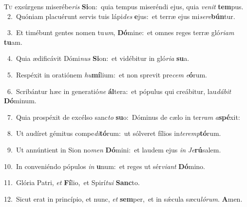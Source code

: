 \lettrine{\initial\textcolor{\initialcolor}{T}}{u} exsúrgens miserébe\textit{ris} \textbf{Si}\-on:~\star quia tempus miseréndi ejus, quia \textit{ve}\-\textit{nit} \textbf{tem}\-pus.\\
{\numbfont\textcolor{\numbcolor}{~2.}}~Quóniam placuérunt servis tuis lápi\textit{des} \textbf{e}\-jus:~\star et terræ ejus mi\-\textit{se}\-\textit{re}\textbf{bún}tur.\par
{\numbfont\textcolor{\numbcolor}{~3.}}~Et timébunt gentes nomen tu\-\textit{um}\-, \textbf{Dó}\-mine:~\star et omnes reges terræ gló\-\textit{ri}\-\textit{am} \textbf{tu}\-am.\par
{\numbfont\textcolor{\numbcolor}{~4.}}~Quia ædificávit Dómi\textit{nus} \textbf{Si}\-on:~\star et vidébitur in gló\-\textit{ri}\-\textit{a} \textbf{su}\-a.\par
{\numbfont\textcolor{\numbcolor}{~5.}}~Respéxit in oratiónem \textit{hu}\-\textbf{mí}lium:~\star et non sprevit pre\textit{cem} \textit{e}\-\textbf{ó}rum.\par
{\numbfont\textcolor{\numbcolor}{~6.}}~Scribántur hæc in generatió\textit{ne} \textbf{ál}\-tera:~\star et pópulus qui creábitur, lau\-\textit{dá}\-\textit{bit} \textbf{Dó}\-minum.\par
{\numbfont\textcolor{\numbcolor}{~7.}}~Quia prospéxit de excélso sanc\textit{to} \textbf{su}\-o:~\star Dóminus de cælo in ter\textit{ram} \textit{a}\-\textbf{spé}xit:\par
{\numbfont\textcolor{\numbcolor}{~8.}}~Ut audíret gémitus compe\-\textit{di}\-\textbf{tó}rum:~\star ut sólveret fílios in\-\textit{ter}\-\textit{emp}\textbf{tó}rum.\par
{\numbfont\textcolor{\numbcolor}{~9.}}~Ut annúntient in Sion no\textit{men} \textbf{Dó}\-mini:~\star et laudem ejus \textit{in} \textit{Je}\-\textbf{rú}salem.\par
{\numbfont\textcolor{\numbcolor}{10.}}~In conveniéndo pópulos \textit{in} \textbf{u}\-num:~\star et reges ut sér\-\textit{vi}\-\textit{ant} \textbf{Dó}\-mino.\par
{\numbfont\textcolor{\numbcolor}{11.}}~Glória Patri, \textit{et} \textbf{Fí}\-lio,~\star et Spirí\-\textit{tu}\-\textit{i} \textbf{Sanc}\-to.\par
{\numbfont\textcolor{\numbcolor}{12.}}~Sicut erat in princípio, et nunc, \textit{et} \textbf{sem}\-per,~\star et in sǽcula sæcu\-\textit{ló}\-\textit{rum}. \textbf{A}\-men.\par
